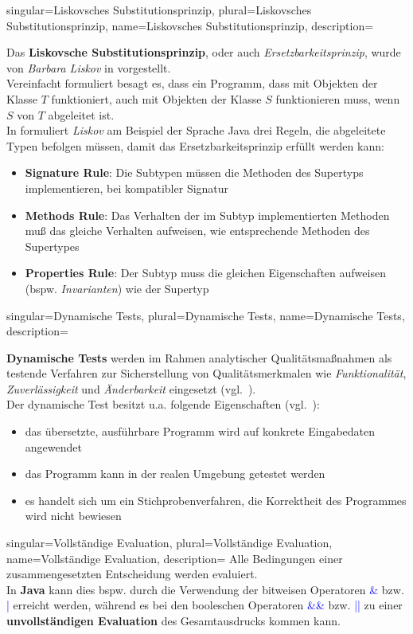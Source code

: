 {
singular={Liskovsches Substitutionsprinzip},
plural={Liskovsches Substitutionsprinzip},
name={Liskovsches Substitutionsprinzip},
description={
Das \textbf{Liskovsche Substitutionsprinzip}, oder auch \textit{Ersetzbarkeitsprinzip}, wurde von \textit{Barbara Liskov} in \cite{Lis87} vorgestellt.\\
Vereinfacht formuliert besagt es, dass ein Programm, dass mit Objekten der Klasse $T$ funktioniert, auch mit Objekten der Klasse $S$ funktionieren muss, wenn $S$ von $T$ abgeleitet ist.\\
In \cite[174 ff.]{LG00} formuliert \textit{Liskov} am Beispiel der Sprache Java drei Regeln, die abgeleitete Typen befolgen müssen, damit das Ersetzbarkeitsprinzip erfüllt werden kann:
\begin{itemize}
\item \textbf{Signature Rule}: Die Subtypen müssen die Methoden des Supertyps implementieren, bei kompatibler Signatur
\item \textbf{Methods Rule}: Das Verhalten der im Subtyp implementierten Methoden muß das gleiche Verhalten aufweisen, wie entsprechende Methoden des Supertypes
\item \textbf{Properties Rule}: Der Subtyp muss die gleichen Eigenschaften aufweisen (bspw. \textit{Invarianten}) wie der Supertyp
\end{itemize}
}
}

{
singular={Dynamische Tests},
plural={Dynamische Tests},
name={Dynamische Tests},
description={
\textbf{Dynamische Tests} werden im Rahmen analytischer Qualitätsmaßnahmen als testende Verfahren zur Sicherstellung von Qualitätsmerkmalen wie \textit{Funktionalität}, \textit{Zuverlässigkeit} und \textit{Änderbarkeit} eingesetzt (vgl.~\cite[Abb. 5.1-2, 394]{Bal97}).\\
Der dynamische Test besitzt u.a. folgende Eigenschaften  (vgl.~\cite[396]{Bal97}):
\begin{itemize}
    \item das übersetzte, ausführbare Programm wird auf konkrete Eingabedaten angewendet
    \item das Programm kann in der realen Umgebung getestet werden
    \item es handelt sich um ein Stichprobenverfahren, die Korrektheit des Programmes wird nicht bewiesen
\end{itemize}
}
}

{
singular={Vollständige Evaluation},
plural={Vollständige Evaluation},
name={Vollständige Evaluation},
description={
Alle Bedingungen einer zusammengesetzten Entscheidung werden evaluiert.\\
In \textbf{Java} kann dies bspw. durch die Verwendung der bitweisen Operatoren \textcolor{blue}{\&} bzw. \textcolor{blue}{|} erreicht werden, während es bei den booleschen Operatoren \textcolor{blue}{\&\&} bzw. \textcolor{blue}{||} zu einer \textbf{unvollständigen Evaluation} des Gesamtausdrucks kommen kann.
}
}

